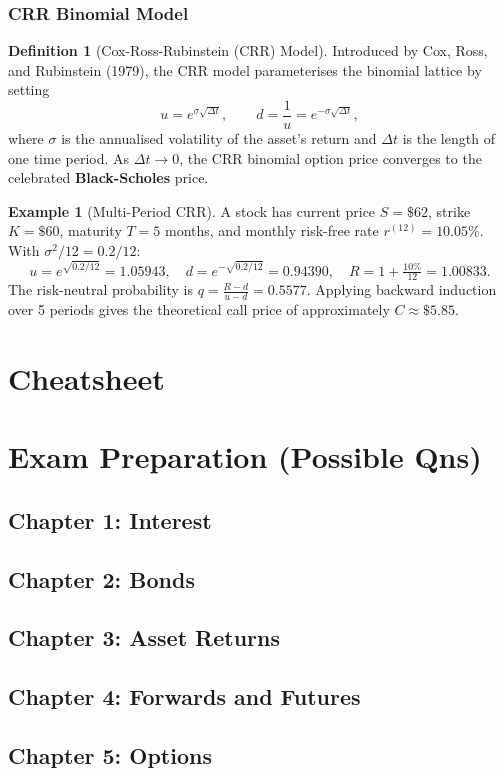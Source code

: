 \documentclass[12pt, a4paper]{article}
\theoremstyle{plain}
\theoremstyle{definition}
\newtheorem{definition}[theorem]{Definition}
\newtheorem{example}[theorem]{Example}
\theoremstyle{remark}
\begin{document}
\subsubsection{CRR Binomial Model}

\begin{definition}[Cox-Ross-Rubinstein (CRR) Model]
  Introduced by Cox, Ross, and Rubinstein (1979), the CRR model parameterises the binomial lattice by setting
  \[
    u = e^{\sigma\sqrt{\Delta t}}, \qquad d = \frac{1}{u} = e^{-\sigma\sqrt{\Delta t}},
  \]
  where $\sigma$ is the annualised volatility of the asset's return and $\Delta t$ is the length of one time period. As $\Delta t \to 0$, the CRR binomial option price converges to the celebrated \textbf{Black-Scholes} price.
\end{definition}

\begin{example}[Multi-Period CRR]
  A stock has current price $S = \$62$, strike $K = \$60$, maturity $T = 5$ months, and monthly risk-free rate $r^{(12)} = 10.05\%$. With $\sigma^2/12 = 0.2/12$:
  \[
    u = e^{\sqrt{0.2/12}} = 1.05943, \quad d = e^{-\sqrt{0.2/12}} = 0.94390, \quad R = 1 + \tfrac{10\%}{12} = 1.00833.
  \]
  The risk-neutral probability is $q = \tfrac{R-d}{u-d} = 0.5577$. Applying backward induction over 5 periods gives the theoretical call price of approximately $C \approx \$5.85$.
\end{example}


\pagebreak
\section{Cheatsheet}


\pagebreak
\section{Exam Preparation (Possible Qns)}

\subsection{Chapter 1: Interest}
\subsection{Chapter 2: Bonds}
\subsection{Chapter 3: Asset Returns}
\subsection{Chapter 4: Forwards and Futures}
\subsection{Chapter 5: Options}
\end{document}

